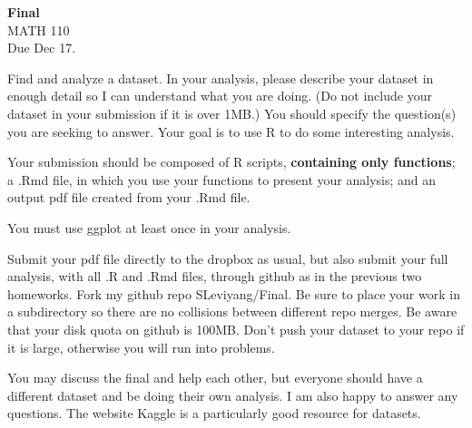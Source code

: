 \documentclass{article}
\begin{document}
\renewcommand{\a}{\textbf{a}}
\renewcommand{\b}{\textbf{b}}
\renewcommand{\d}{\textbf{d}}
\newcommand{\e}{\textbf{e}}

\large

\begin{center}
\textbf{Final} \\  
MATH 110\\
Due Dec 17.
\end{center}

\medskip

Find and analyze a dataset.   In your analysis, please describe your dataset in enough detail so I can understand what you are doing.  (Do not include your dataset in your submission if it is over 1MB.)  You should specify the question(s) you are seeking to answer.   Your goal is to use R to do some interesting analysis.  

\vspace{.3cm}

Your submission should be composed of R scripts, \textbf{containing only functions}; a .Rmd file, in which you use your functions to present your analysis; and an output pdf file created from your .Rmd file. 

\vspace{.3cm}

You must use ggplot at least once in your analysis.  

\vspace{.3cm}

Submit your pdf file directly to the dropbox as usual, but also submit your full analysis, with all .R and .Rmd files, through github as in the previous two homeworks.   Fork my github repo SLeviyang/Final.  Be sure to place your work in a subdirectory so there are no collisions between different repo merges.  Be aware that your disk quota on github is 100MB.  Don't push your dataset to your repo if it is large, otherwise you will run into problems.

\vspace{.3cm}

You may discuss the final and help each other, but everyone should have a different dataset and be doing their own analysis.  I am also happy to answer any questions.  The website Kaggle is a particularly good resource for datasets.
\end{document}
